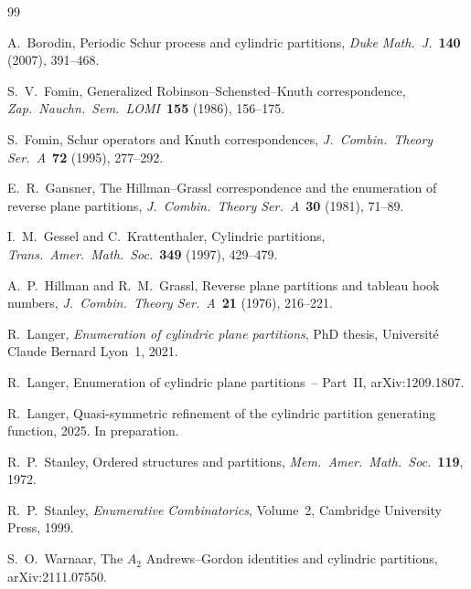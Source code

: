 \documentclass[11pt]{article}
\begin{document}

\begin{thebibliography}{99}

A.~Borodin,
Periodic Schur process and cylindric partitions,
\emph{Duke Math.\ J.}\ \textbf{140} (2007), 391--468.

S.~V.~Fomin,
Generalized Robinson--Schensted--Knuth correspondence,
\emph{Zap.\ Nauchn.\ Sem.\ LOMI}\ \textbf{155} (1986), 156--175.

S.~Fomin,
Schur operators and Knuth correspondences,
\emph{J.~Combin.\ Theory Ser.~A}\ \textbf{72} (1995), 277--292.

E.~R.~Gansner,
The Hillman--Grassl correspondence and the enumeration of
reverse plane partitions,
\emph{J.~Combin.\ Theory Ser.~A}\ \textbf{30} (1981), 71--89.

I.~M.~Gessel and C.~Krattenthaler,
Cylindric partitions,
\emph{Trans.\ Amer.\ Math.\ Soc.}\ \textbf{349} (1997), 429--479.

A.~P.~Hillman and R.~M.~Grassl,
Reverse plane partitions and tableau hook numbers,
\emph{J.~Combin.\ Theory Ser.~A}\ \textbf{21} (1976), 216--221.

R.~Langer,
\emph{Enumeration of cylindric plane partitions},
PhD thesis, Universit\'e Claude Bernard Lyon~1, 2021.

R.~Langer,
Enumeration of cylindric plane partitions~-- Part~II,
arXiv:1209.1807.

R.~Langer,
Quasi-symmetric refinement of the cylindric partition
generating function, 2025. In preparation.

R.~P.~Stanley,
Ordered structures and partitions,
\emph{Mem.\ Amer.\ Math.\ Soc.}\ \textbf{119}, 1972.

R.~P.~Stanley,
\emph{Enumerative Combinatorics}, Volume~2,
Cambridge University Press, 1999.

S.~O.~Warnaar,
The $A_2$ Andrews--Gordon identities and cylindric partitions,
arXiv:2111.07550.

\end{thebibliography}
\end{document}
